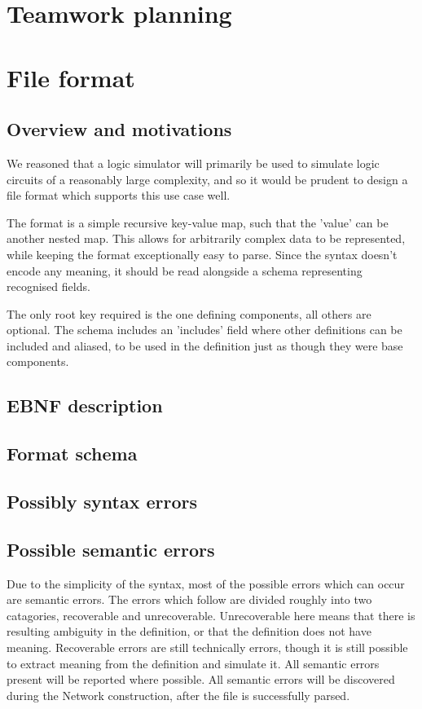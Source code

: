 \documentclass[a4paper]{article}
\begin{document}
\section{Teamwork planning}

\section{File format}
    \subsection{Overview and motivations}
        We reasoned that a logic simulator will primarily be used to simulate logic circuits of a reasonably large complexity, and so it would be prudent to design a file format which supports this use case well.

        The format is a simple recursive key-value map, such that the 'value' can be another nested map. This allows for arbitrarily complex data to be represented, while keeping the format exceptionally easy to parse. Since the syntax doesn't encode any meaning, it should be read alongside a schema representing recognised fields.

        The only root key required is the one defining components, all others are optional. The schema includes an 'includes' field where other definitions can be included and aliased, to be used in the definition just as though they were base components.

    \subsection{EBNF description}
    

    \subsection{Format schema}
    

    \subsection{Possibly syntax errors}

    \subsection{Possible semantic errors}
        Due to the simplicity of the syntax, most of the possible errors which can occur are semantic errors. The errors which follow are divided roughly into two catagories, recoverable and unrecoverable. Unrecoverable here means that there is resulting ambiguity in the definition, or that the definition does not have meaning. Recoverable errors are still technically errors, though it is still possible to extract meaning from the definition and simulate it. All semantic errors present will be reported where possible. All semantic errors will be discovered during the Network construction, after the file is successfully parsed.
\end{document}
